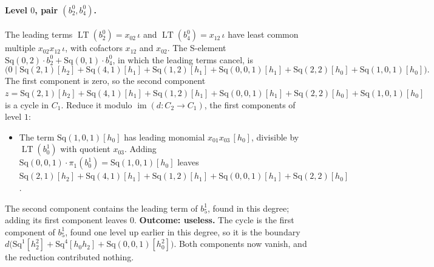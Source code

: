 \documentclass[11pt]{article}
\newcommand{\Sq}{\mathrm{Sq}}
\DeclareMathOperator{\LT}{LT}
\begin{document}
\paragraph{Level $0$, pair $(b^{0}_{2}, b^{0}_{4})$.} The leading terms $\LT(b^{0}_{2}) = x_{02}\,\iota$ and $\LT(b^{0}_{4}) = x_{12}\,\iota$ have least common multiple $x_{02}x_{12}\,\iota$, with cofactors $x_{12}$ and $x_{02}$. The S-element $\Sq(0,2)\cdot b^{0}_{2} + \Sq(0,1)\cdot b^{0}_{4}$, in which the leading terms cancel, is
\[\bigl(0 \;\big|\; \Sq(2,1)[h_2] + \Sq(4,1)[h_1] + \Sq(1,2)[h_1] + \Sq(0,0,1)[h_1] + \Sq(2,2)[h_0] + \Sq(1,0,1)[h_0]\bigr).\]
The first component is zero, so the second component $z = \Sq(2,1)[h_2] + \Sq(4,1)[h_1] + \Sq(1,2)[h_1] + \Sq(0,0,1)[h_1] + \Sq(2,2)[h_0] + \Sq(1,0,1)[h_0]$ is a cycle in $C_{1}$.
Reduce it modulo $\operatorname{im}(d\colon C_{2}\to C_{1})$, the first components of level $1$:
\begin{itemize}
\item The term $\Sq(1,0,1)[h_0]$ has leading monomial $x_{01}x_{03}\,[h_0]$, divisible by $\LT(b^{1}_{0})$ with quotient $x_{03}$. Adding $\Sq(0,0,1)\cdot \pi_1(b^{1}_{0}) = \Sq(1,0,1)[h_0]$ leaves $\Sq(2,1)[h_2] + \Sq(4,1)[h_1] + \Sq(1,2)[h_1] + \Sq(0,0,1)[h_1] + \Sq(2,2)[h_0]$.
\end{itemize}
The second component contains the leading term of $b^{1}_{5}$, found in this degree; adding its first component leaves $0$.
\textbf{Outcome: useless.} The cycle is the first component of $b^{1}_{5}$, found one level up earlier in this degree, so it is the boundary $d\bigl(\Sq^{1}[h_2^2] + \Sq^{4}[h_0h_2] + \Sq(0,0,1)[h_0^2]\bigr)$. Both components now vanish, and the reduction contributed nothing.
\medskip
\end{document}
